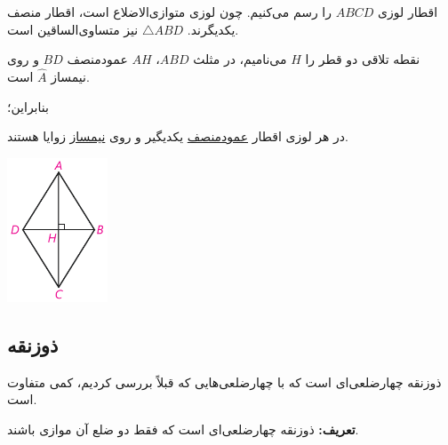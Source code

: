 \documentclass[12pt, a4paper]{book}
\begin{document}
\begin{minipage}{.8\textwidth}
	
	اقطار لوزی
	$ABCD$
	را رسم می‌کنیم. چون لوزی متوازی‌الاضلاع است، اقطار منصف یکدیگرند. 
	$
	\triangle ABD
	$
	نیز متساوی‌الساقین است.
	
	نقطه تلاقی دو قطر را
	$H$
	می‌نامیم، در مثلث
	$ABD$،
	$AH$
	عمودمنصف
	$BD$
	و روی نیمساز 
	$
	\widehat{A}
	$
	است.
	
	بنابراین؛

 در هر لوزی اقطار \underline{عمودمنصف} یکدیگیر و روی \underline{نیمساز} زوایا هستند.

\end{minipage}
\begin{minipage}{.2\textwidth}
	\begin{flushleft}
		\includegraphics[width=3cm]{"Shapes/Fasl - 3/Dars 1/2-3.1.pdf"}
	\end{flushleft}
\end{minipage}

\subsection{ذوزنقه}
ذوزنقه چهارضلعی‌ای است که با چهارضلعی‌هایی که قبلاً بررسی کردیم، کمی متفاوت است.

\textbf{تعریف:} ذوزنقه چهارضلعی‌ای است که فقط دو ضلع آن موازی باشند.
\end{document}
